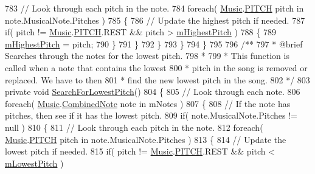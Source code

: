 \begin{DoxyCodeInclude}
783                 \textcolor{comment}{// Look through each pitch in the note.}
784                 \textcolor{keywordflow}{foreach}( \hyperlink{class_music}{Music}.\hyperlink{group___music_enums_ga508f69b199ea518f935486c990edac1d}{PITCH} pitch in note.MusicalNote.Pitches )
785                 \{
786                     \textcolor{comment}{// Update the highest pitch if needed.}
787                     \textcolor{keywordflow}{if}( pitch != \hyperlink{class_music}{Music}.\hyperlink{group___music_enums_ga508f69b199ea518f935486c990edac1d}{PITCH}.REST && pitch > 
      \hyperlink{group___song_priv_var_ga2dcd39d9add609e9df56a94057441dcc}{mHighestPitch} )
788                     \{
789                         \hyperlink{group___song_priv_var_ga2dcd39d9add609e9df56a94057441dcc}{mHighestPitch} = pitch;
790                     \}
791                 \}
792             \}
793         \}
794     \}
795 \textcolor{comment}{}
796 \textcolor{comment}{    /**}
797 \textcolor{comment}{     * @brief Searches through the notes for the lowest pitch. }
798 \textcolor{comment}{     * }
799 \textcolor{comment}{     * This function is called when a note that contains the lowest}
800 \textcolor{comment}{     * pitch in the song is removed or replaced. We have to then}
801 \textcolor{comment}{     * find the new lowest pitch in the song.}
802 \textcolor{comment}{    */}
803     \textcolor{keyword}{private} \textcolor{keywordtype}{void} \hyperlink{group___song_priv_func_gac2e812c6385529eb7a9be5082c7bde75}{SearchForLowestPitch}()
804     \{
805         \textcolor{comment}{// Look through each note.}
806         \textcolor{keywordflow}{foreach}( \hyperlink{class_music}{Music}.\hyperlink{group___music_structs_struct_music_1_1_combined_note}{CombinedNote} note in mNotes )
807         \{
808             \textcolor{comment}{// If the note has pitches, then see if it has the lowest pitch.}
809             \textcolor{keywordflow}{if}( note.MusicalNote.Pitches != null )
810             \{
811                 \textcolor{comment}{// Look through each pitch in the note.}
812                 \textcolor{keywordflow}{foreach}( \hyperlink{class_music}{Music}.\hyperlink{group___music_enums_ga508f69b199ea518f935486c990edac1d}{PITCH} pitch in note.MusicalNote.Pitches )
813                 \{
814                     \textcolor{comment}{// Update the lowest pitch if needed.}
815                     \textcolor{keywordflow}{if}( pitch != \hyperlink{class_music}{Music}.\hyperlink{group___music_enums_ga508f69b199ea518f935486c990edac1d}{PITCH}.REST && pitch < 
      \hyperlink{group___song_priv_var_ga293976ef4c2050687a81edfbf77b4fc1}{mLowestPitch} )

\end{DoxyCodeInclude}
